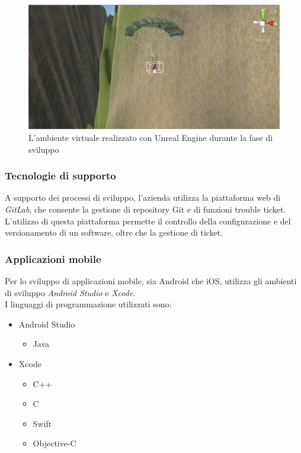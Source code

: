 \begin{figure}[H]
	\begin{center}
	\includegraphics[scale=0.22]{immagini/unity.png}
	\caption{L'ambiente virtuale realizzato con Unreal Engine durante la fase di sviluppo}
	\end{center}
\end{figure}

\subsubsection{Tecnologie di supporto}
A supporto dei processi di sviluppo, l'azienda utilizza la piattaforma web di \textit{GitLab}, che consente la gestione di repository Git e di funzioni trouble ticket.\\
L'utilizzo di questa piattaforma permette il controllo della configurazione e del versionamento di un software, oltre che la gestione di ticket.

\subsubsection{Applicazioni mobile}
Per lo sviluppo di applicazioni mobile, sia Android che iOS, \lab{} utilizza gli ambienti di sviluppo \textit{Android Studio} e \textit{Xcode}.
\\
I linguaggi di programmazione utilizzati sono:
\begin{itemize}
\item Android Studio
	\begin{itemize}
		\item Java
	\end{itemize}
\item Xcode
	\begin{itemize}
		\item C++
		\item C
		\item Swift
		\item Objective-C
	\end{itemize}
\end{itemize}

